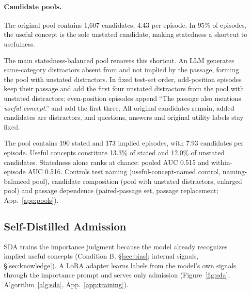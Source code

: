 \paragraph{Candidate pools.}
The original pool contains 1,607 candidates, 4.43 per episode. In 95\% of episodes, the useful concept is the sole unstated candidate, making statedness a shortcut to usefulness.

The main statedness-balanced pool removes this shortcut. An LLM generates same-category distractors absent from and not implied by the passage, forming the pool with unstated distractors. In fixed test-set order, odd-position episodes keep their passage and add the first four unstated distractors from the pool with unstated distractors; even-position episodes append ``The passage also mentions \emph{useful concept}.'' and add the first three. All original candidates remain, added candidates are distractors, and questions, answers and original utility labels stay fixed.

The pool contains 190 stated and 173 implied episodes, with 7.93 candidates per episode. Useful concepts constitute 13.3\% of stated and 12.0\% of unstated candidates. Statedness alone ranks at chance: pooled AUC 0.515 and within-episode AUC 0.516. Controls test naming (useful-concept-named control, naming-balanced pool), candidate composition (pool with unstated distractors, enlarged pool) and passage dependence (paired-passage set, passage replacement; App.~\ref{app:pools}).

\subsection{Self-Distilled Admission}\label{sec:sda}

SDA trains the importance judgment because the model already recognizes implied useful concepts (Condition B, \S\ref{sec:bias}; internal signals, \S\ref{sec:knowledge}). A LoRA adapter learns labels from the model's own signals through the importance prompt and serves only admission (Figure~\ref{fig:sda}; Algorithm~\ref{alg:sda}, App.~\ref{app:training}).

